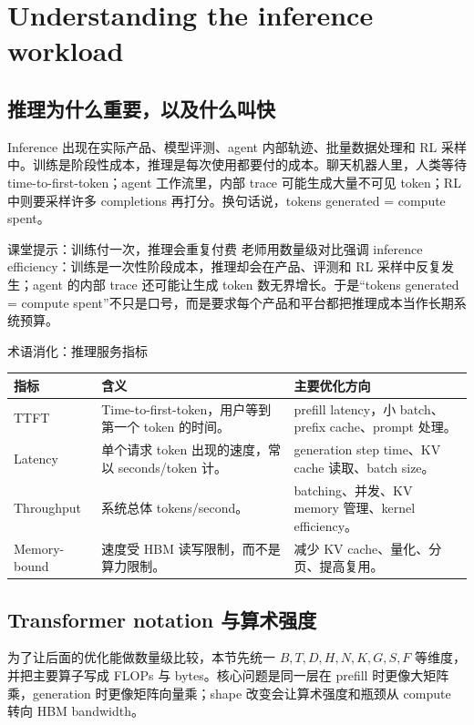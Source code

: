 \section{Understanding the inference workload}

\subsection{推理为什么重要，以及什么叫快}

Inference 出现在实际产品、模型评测、agent 内部轨迹、批量数据处理和 RL 采样中。训练是阶段性成本，推理是每次使用都要付的成本。聊天机器人里，人类等待 time-to-first-token；agent 工作流里，内部 trace 可能生成大量不可见 token；RL 中则要采样许多 completions 再打分。换句话说，tokens generated = compute spent。

\begin{knowledgebox}{课堂提示：训练付一次，推理会重复付费}
老师用数量级对比强调 inference efficiency：训练是一次性阶段成本，推理却会在产品、评测和 RL 采样中反复发生；agent 的内部 trace 还可能让生成 token 数无界增长。于是“tokens generated = compute spent”不只是口号，而是要求每个产品和平台都把推理成本当作长期系统预算。
\end{knowledgebox}

\begin{knowledgebox}{术语消化：推理服务指标}
\begin{tabular}{L{0.22\textwidth}L{0.34\textwidth}L{0.34\textwidth}}
\toprule
指标 & 含义 & 主要优化方向 \\
\midrule
TTFT & Time-to-first-token，用户等到第一个 token 的时间。 & prefill latency，小 batch、prefix cache、prompt 处理。 \\
Latency & 单个请求 token 出现的速度，常以 seconds/token 计。 & generation step time、KV cache 读取、batch size。 \\
Throughput & 系统总体 tokens/second。 & batching、并发、KV memory 管理、kernel efficiency。 \\
Memory-bound & 速度受 HBM 读写限制，而不是算力限制。 & 减少 KV cache、量化、分页、提高复用。 \\
\bottomrule
\end{tabular}
\end{knowledgebox}

\subsection{Transformer notation 与算术强度}

为了让后面的优化能做数量级比较，本节先统一 $B,T,D,H,N,K,G,S,F$ 等维度，并把主要算子写成 FLOPs 与 bytes。核心问题是同一层在 prefill 时更像大矩阵乘，generation 时更像矩阵向量乘；shape 改变会让算术强度和瓶颈从 compute 转向 HBM bandwidth。

